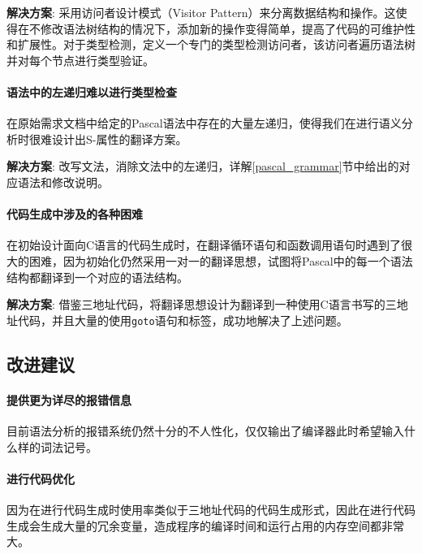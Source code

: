 \documentclass[../main.tex]{subfiles}
\begin{document}
\textbf{解决方案}: 采用访问者设计模式（Visitor Pattern）来分离数据结构和操作。这使得在不修改语法树结构的情况下，添加新的操作变得简单，提高了代码的可维护性和扩展性。对于类型检测，定义一个专门的类型检测访问者，该访问者遍历语法树并对每个节点进行类型验证。

\paragraph{语法中的左递归难以进行类型检查}
在原始需求文档中给定的Pascal语法中存在的大量左递归，使得我们在进行语义分析时很难设计出S-属性的翻译方案。

\textbf{解决方案}: 改写文法，消除文法中的左递归，详解\ref{pascal_grammar}节中给出的对应语法和修改说明。

\paragraph{代码生成中涉及的各种困难}
在初始设计面向C语言的代码生成时，在翻译循环语句和函数调用语句时遇到了很大的困难，因为初始化仍然采用一对一的翻译思想，试图将Pascal中的每一个语法结构都翻译到一个对应的语法结构。

\textbf{解决方案}: 借鉴三地址代码，将翻译思想设计为翻译到一种使用C语言书写的三地址代码，并且大量的使用\texttt{goto}语句和标签，成功地解决了上述问题。

\subsection{改进建议}

\paragraph{提供更为详尽的报错信息} 目前语法分析的报错系统仍然十分的不人性化，仅仅输出了编译器此时希望输入什么样的词法记号。

\paragraph{进行代码优化} 因为在进行代码生成时使用率类似于三地址代码的代码生成形式，因此在进行代码生成会生成大量的冗余变量，造成程序的编译时间和运行占用的内存空间都非常大。
\end{document}
